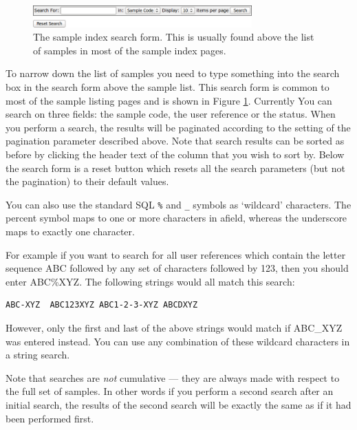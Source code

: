 \documentclass[12pt,twoside]{article}
\begin{document}
\begin{figure}[!htb]
\begin{center}
\includegraphics[width=0.75\textwidth]{searchform}
\caption{The sample index search form. This is usually found
above the list of samples in most of the sample index pages.
\label{fig:searchform}}
\end{center}
\end{figure}

To narrow down the list of samples you need to type something into
the search box in the search form above the sample list. This search form
is common to most of the sample listing pages and is shown in
Figure \ref{fig:searchform}.
Currently You can search on three fields: 
the sample code, the user reference or the status. When you perform
a search, the results will be paginated according to the setting of the
pagination parameter described above. Note that search results can be
sorted as before by clicking the header text of the column that you
wish to sort by.
Below the search form is a reset button which resets all the search
parameters (but not the pagination) to their default values.

You can also use the standard SQL \verb=%= and \verb=_= symbols as `wildcard'
characters. The percent symbol maps to one or more characters in afield,
whereas the underscore maps to exactly one character.

For example if you want to search for all user references which contain
the letter sequence ABC followed by any set of characters followed
by 123, then you should enter ABC\%XYZ. The following strings would all
match this search:
\begin{verbatim}
ABC-XYZ  ABC123XYZ ABC1-2-3-XYZ ABCDXYZ
\end{verbatim}
However, only the first and last of the above strings would match if
ABC\_XYZ was entered instead. You can use any combination
of these wildcard characters in a string search.

\begin{plainblock}
Note that searches are \emph{not} cumulative --- they are always made
with respect to the full set of samples. In other words if you perform
a second search after an initial search, the results of the second search
will be exactly the same as if it had been performed first.
\end{plainblock}
\end{document}
